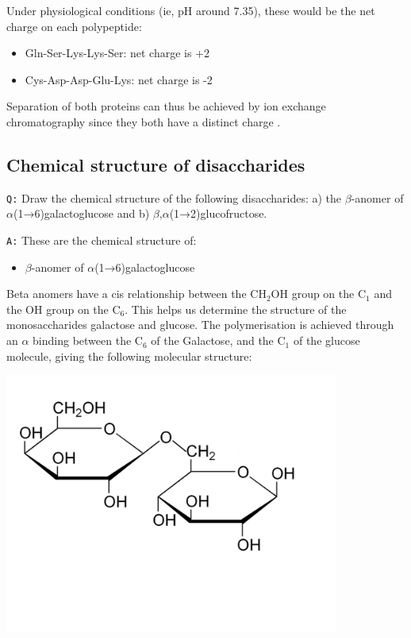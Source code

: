\documentclass[11pt, a4paper,titlepage]{article}
\begin{document}
Under physiological conditions (ie, pH around 7.35), these would be
the net charge on each polypeptide:

\begin{itemize}
\item Gln-Ser-Lys-Lys-Ser: net charge is +2

\item Cys-Asp-Asp-Glu-Lys: net charge is -2

\end{itemize}

Separation of both proteins can thus be achieved by ion exchange
chromatography since they both have a distinct charge
\cite{BioChemPrinciples}.
\subsection{Chemical structure of disaccharides}
\label{sec-2-3}

\texttt{Q:} Draw the chemical structure of the following disaccharides: a)
the $\beta$-anomer of $\alpha$(1→6)galactoglucose and b)
$\beta$,$\alpha$(1→2)glucofructose.

\texttt{A:} These are the chemical structure of:
\begin{itemize}
\item $\beta$-anomer of $\alpha$(1→6)galactoglucose
\end{itemize}

Beta anomers have a cis relationship between the CH$_{2}$OH group on
the C$_{1}$ and the OH group on the C$_{6}$. This helps us determine the
structure of the monosaccharides galactose and glucose. The
polymerisation is achieved through an $\alpha$ binding between the
C$_{6}$ of the Galactose, and the C$_{1}$ of the glucose molecule, giving
the following molecular structure:

\includegraphics[width=11cm]{./Figures/B-A(1-6)GalactoGlucose.pdf}
\end{document}
